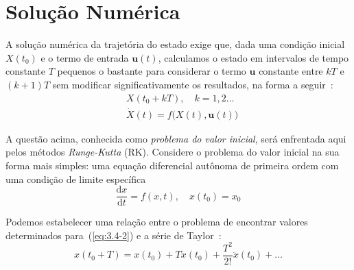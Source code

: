 \section{Solução Numérica}

A solução numérica da trajetória do estado exige que, dada uma condição inicial \(X\left(t_{0}\right)\) e o termo de entrada \(\mathbf{u}(t)\), calculamos o estado em intervalos de tempo constante \(T\) pequenos o bastante para considerar o termo \(\mathbf{u}\) constante entre \(kT\) e \(\left(k+1\right)T\) sem modificar significativamente os resultados, na forma a seguir~\cite{Stevens2016}:
\begin{align}
    &X \left( t_{0} + kT \right), \quad k = 1,2 \ldots\label{3.4-1a} \\
    &\dot{X} \left( t \right) = f \big(X\left(t\right), \mathbf{u}\left(t\right)\big)\label{eq:3.4-1b}
\end{align}


A questão acima, conhecida como \emph{problema do valor inicial}, será enfrentada aqui pelos métodos \emph{Runge-Kutta} (RK). Considere o problema do valor inicial na sua forma mais simples: uma equação diferencial autônoma de primeira ordem com uma condição de limite específica~\cite{Stevens2016}
\begin{equation}\label{eq:3.4-2}
    {\frac{\textrm{d}x}{\textrm{d}t}} = f \left( x, t \right), \quad
    x \left( t_{0} \right) = x_{0}
\end{equation}

Podemos estabelecer uma relação entre o problema de encontrar valores determinados para~(\ref{eq:3.4-2}) e a série de Taylor~\cite{Stevens2016}:
\begin{equation}\label{eq:3.4-3}
    x \left(t_{0} + T \right) = x \left(t_{0}\right) + T \dot{x}\left(t_{0}\right) + \frac{T^{2}}{2!} \ddot{x}\left(t_{0}\right) + \ldots
\end{equation}


